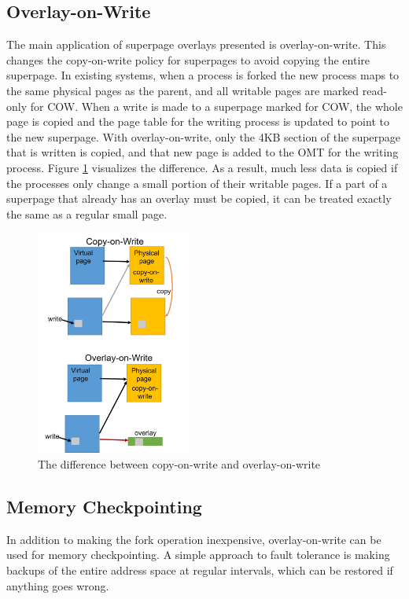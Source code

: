 \subsection{Overlay-on-Write}
The main application of superpage overlays presented is overlay-on-write. This changes the copy-on-write policy for superpages to avoid copying the entire superpage. In existing systems, when a process is forked the new process maps to the same physical pages as the parent, and all writable pages are marked read-only for COW. When a write is made to a superpage marked for COW, the whole page is copied and the page table for the writing process is updated to point to the new superpage. With overlay-on-write, only the 4KB section of the superpage that is written is copied, and that new page is added to the OMT for the writing process. Figure \ref{fig:oow} visualizes the difference. As a result, much less data is copied if the processes only change a small portion of their writable pages. If a part of a superpage that already has an overlay must be copied, it can be treated exactly the same as a regular small page.
\begin{figure}
    \centering
    \includegraphics[width=2in]{Figures/Picture2}
    \caption{The difference between copy-on-write and overlay-on-write}
    \label{fig:oow}
\end{figure}

\subsection{Memory Checkpointing}
In addition to making the fork operation inexpensive, overlay-on-write can be used for memory checkpointing. A simple approach to fault tolerance is making backups of the entire address space at regular intervals, which can be restored if anything goes wrong.

